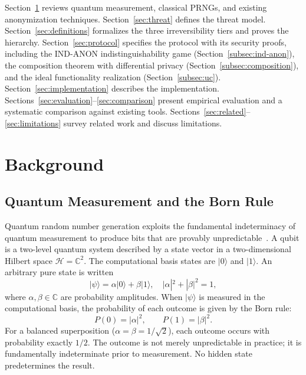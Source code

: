 \documentclass[journal]{IEEEtran}
\begin{document}
Section~\ref{sec:background} reviews quantum measurement, classical PRNGs, and existing anonymization techniques. Section~\ref{sec:threat} defines the threat model. Section~\ref{sec:definitions} formalizes the three irreversibility tiers and proves the hierarchy. Section~\ref{sec:protocol} specifies the protocol with its security proofs, including the IND-ANON indistinguishability game (Section~\ref{subsec:ind-anon}), the composition theorem with differential privacy (Section~\ref{subsec:composition}), and the ideal functionality realization (Section~\ref{subsec:uc}). Section~\ref{sec:implementation} describes the implementation. Sections~\ref{sec:evaluation}--\ref{sec:comparison} present empirical evaluation and a systematic comparison against existing tools. Sections~\ref{sec:related}--\ref{sec:limitations} survey related work and discuss limitations.

\section{Background}
\label{sec:background}

\subsection{Quantum Measurement and the Born Rule}
\label{subsec:born}

Quantum random number generation exploits the fundamental indeterminacy of quantum measurement to produce bits that are provably unpredictable~\cite{ma2016qrng, herrero2017qrng}. A qubit is a two-level quantum system described by a state vector in a two-dimensional Hilbert space $\mathcal{H} = \mathbb{C}^2$. The computational basis states are $|0\rangle$ and $|1\rangle$. An arbitrary pure state is written
\begin{equation}
|\psi\rangle = \alpha|0\rangle + \beta|1\rangle, \quad |\alpha|^2 + |\beta|^2 = 1,
\label{eq:qubit}
\end{equation}
where $\alpha, \beta \in \mathbb{C}$ are probability amplitudes. When $|\psi\rangle$ is measured in the computational basis, the probability of each outcome is given by the Born rule:
\begin{equation}
P(0) = |\alpha|^2, \qquad P(1) = |\beta|^2.
\label{eq:born}
\end{equation}
For a balanced superposition ($\alpha = \beta = 1/\sqrt{2}$), each outcome occurs with probability exactly $1/2$. The outcome is not merely unpredictable in practice; it is fundamentally indeterminate prior to measurement. No hidden state predetermines the result.
\end{document}
